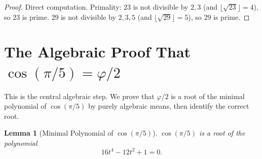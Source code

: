 \documentclass[11pt,a4paper]{article}
\theoremstyle{plain}
\newtheorem{lemma}[theorem]{Lemma}
\theoremstyle{definition}
\begin{document}
\begin{proof}
Direct computation. Primality: $23$ is not divisible by $2, 3$
(and $\lfloor\sqrt{23}\rfloor = 4$), so $23$ is prime.
$29$ is not divisible by $2, 3, 5$ (and $\lfloor\sqrt{29}\rfloor = 5$),
so $29$ is prime.
\end{proof}

\section{The Algebraic Proof That $\cos(\pi/5) = \varphi/2$}
\label{sec:cos-proof}

This is the central algebraic step. We prove that $\varphi/2$ is a root
of the minimal polynomial of $\cos(\pi/5)$ by purely algebraic means,
then identify the correct root.

\begin{lemma}[Minimal Polynomial of $\cos(\pi/5)$]\label{lem:cheby}
$\cos(\pi/5)$ is a root of the polynomial
\begin{equation}\label{eq:cheby-poly}
  16t^4 - 12t^2 + 1 = 0.
\end{equation}
\end{lemma}
\end{document}
